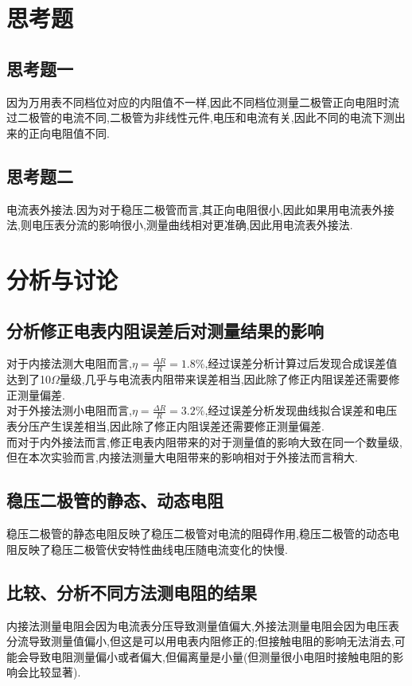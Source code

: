 \documentclass[a4 paper,12pt]{article}
\begin{document}
\section{思考题}
\subsection{思考题一}
因为万用表不同档位对应的内阻值不一样,因此不同档位测量二极管正向电阻时流过二极管的电流不同,二极管为非线性元件,电压和电流有关,因此不同的电流下测出来的正向电阻值不同.
\subsection{思考题二}
电流表外接法.因为对于稳压二极管而言,其正向电阻很小,因此如果用电流表外接法,则电压表分流的影响很小,测量曲线相对更准确,因此用电流表外接法.
\section{分析与讨论}
\subsection{分析修正电表内阻误差后对测量结果的影响}
对于内接法测大电阻而言,$\eta=\frac{\Delta R}{R}=1.8\%$,经过误差分析计算过后发现合成误差值达到了10$\Omega$量级,几乎与电流表内阻带来误差相当,因此除了修正内阻误差还需要修正测量偏差.\\

对于外接法测小电阻而言,$\eta=\frac{\Delta R}{R}=3.2\%$,经过误差分析发现曲线拟合误差和电压表分压产生误差相当,因此除了修正内阻误差还需要修正测量偏差.\\

而对于内外接法而言,修正电表内阻带来的对于测量值的影响大致在同一个数量级,但在本次实验而言,内接法测量大电阻带来的影响相对于外接法而言稍大.
\subsection{稳压二极管的静态、动态电阻}
稳压二极管的静态电阻反映了稳压二极管对电流的阻碍作用,稳压二极管的动态电阻反映了稳压二极管伏安特性曲线电压随电流变化的快慢.
\subsection{比较、分析不同方法测电阻的结果}
内接法测量电阻会因为电流表分压导致测量值偏大,外接法测量电阻会因为电压表分流导致测量值偏小,但这是可以用电表内阻修正的;但接触电阻的影响无法消去,可能会导致电阻测量偏小或者偏大,但偏离量是小量(但测量很小电阻时接触电阻的影响会比较显著).\\
\end{document}
